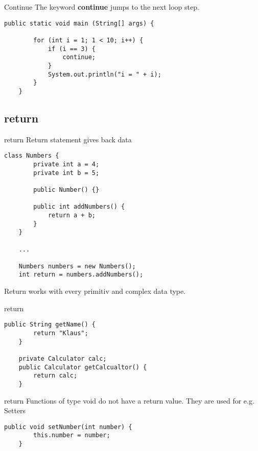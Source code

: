 \begin{frame}[fragile]{Continue}
	The keyword \textbf{continue} jumps to the next loop step.
	\begin{lstlisting}[basicstyle=\ttfamily\scriptsize]
	public static void main (String[] args) {
	
	    for (int i = 1; 1 < 10; i++) {
	        if (i == 3) {
	            continue;
	        }
	        System.out.println("i = " + i);
	    }
	}
	\end{lstlisting}
\end{frame}

\subsection{return}
\begin{frame}[fragile]{return}
	Return statement gives back data
	\begin{lstlisting}[basicstyle=\ttfamily\scriptsize]
	class Numbers {
		private int a = 4;
		private int b = 5;
		
		public Number() {}
		
		public int addNumbers() {
			return a + b;
		}
	}
	
	...
	
	Numbers numbers = new Numbers();
	int return = numbers.addNumbers();
	\end{lstlisting}
	
	Return works with every primitiv and complex data type.
	
\end{frame}

\begin{frame}[fragile]{return}
	\begin{lstlisting}[basicstyle=\ttfamily\scriptsize]
	public String getName() {
		return "Klaus";
	}
	
	private Calculator calc;
	public Calculator getCalcualtor() {
		return calc;
	}
	\end{lstlisting}
\end{frame}

\begin{frame}[fragile]{return}
	Functions of type void do not have a return value.
	They are used for e.g. Setters
	\begin{lstlisting}[basicstyle=\ttfamily\scriptsize]
	public void setNumber(int number) {
		this.number = number;
	}
	\end{lstlisting}
\end{frame}


